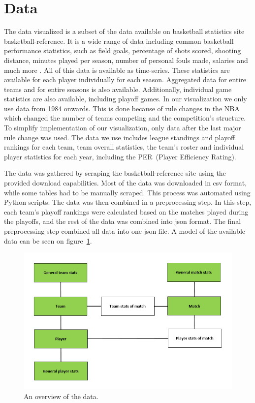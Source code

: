 \documentclass[]{sigchi}
\begin{document}
\section{Data}\label{sec:data}
The data visualized is a subset of the data available on basketball statistics
site basketball-reference\cite{basketball-reference}. It is a wide range of data including common basketball performance statistics, such as field goals, percentage of shots scored, shooting distance, minutes played per season, number of personal fouls made, salaries and much more . All of this data is available as time-series. These statistics are available for each player individually for each season. Aggregated data for entire teams and for entire seasons is also available. Additionally, individual game statistics are also available, including playoff games. In our visualization we only use data from 1984 onwards. This is done because of rule changes in the NBA which changed the number of teams competing and the
competition's structure. To simplify implementation of our visualization, only
data after the last major rule change was used.  The data we use includes league
standings and playoff rankings for each team, team overall statistics, the
team's roster and individual player statistics for each year, including the
PER~(Player Efficiency Rating)\cite{per}. 

The data was gathered by scraping the basketball-reference site using the
provided download capabilities. Most of the data was downloaded in csv format,
while some tables had to be manually scraped. This process was automated using
Python scripts. The data was then combined in a preprocessing step. In this
step, each team's playoff rankings were calculated based on the matches played
during the playoffs, and the rest of the data was combined into json format. The
final preprocessing step combined all data into one json file. A model of the
available data can be seen on figure~\ref{fig:data}.

\begin{figure}
\centering
  \includegraphics[width=1.0\columnwidth]{figures/data}
  \caption{An overview of the data.}
  \label{fig:data}
\end{figure}
\end{document}

